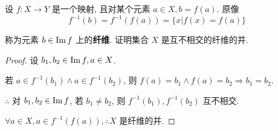 \documentclass[color=black,device=normal,lang=cn,mode=geye]{elegantnote}
\begin{document}
\begin{exercise}%
    设 $f:X\to Y$ 是一个映射, 且对某个元素 $a\in X,b=f(a)$. 原像
    \[f^{-1}(b)=f^{-1}(f(a))=\{x|f(x)=f(a)\}\]

    称为元素 $b\in\operatorname{Im} f$ 上的\textbf{纤维}. 证明集合 $X$ 是互不相交的纤维的并.
\end{exercise}
\begin{proof}
    设 $b_1,b_2\in\operatorname{Im} f,a\in X$.

    若 $a\in f^{-1}(b_1)\land a\in f^{-1}(b_2)$, 则 $f(a)=b_1\land f(a)=b_2\Rightarrow b_1=b_2$.

    $\therefore$ 对 $b_1,b_2\in\operatorname{Im} f$, 若 $b_1\neq b_2$, 则 $f^{-1}(b_1),f^{-1}(b_2)$ 互不相交.

    $\forall a\in X,a\in f^{-1}(f(a)),\therefore X$ 是纤维的并.
\end{proof}
\end{document}
